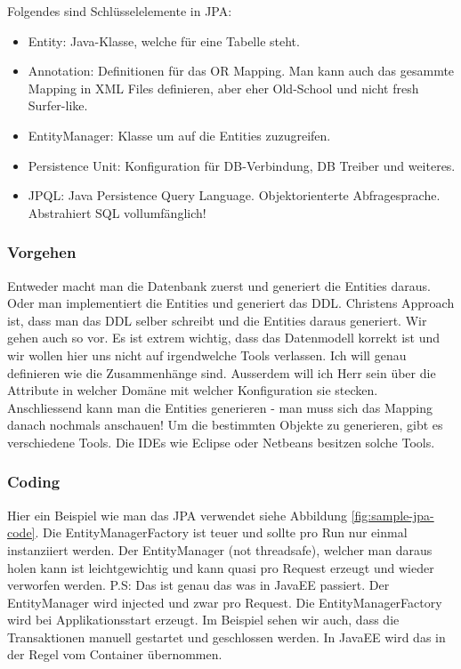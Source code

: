 Folgendes sind Schlüsselelemente in JPA:
\begin{itemize}
	\item Entity: Java-Klasse, welche für eine Tabelle steht.
	\item Annotation: Definitionen für das OR Mapping. Man kann auch das gesammte Mapping in XML Files definieren, aber eher Old-School und nicht fresh Surfer-like.
	\item EntityManager: Klasse um auf die Entities zuzugreifen.
	\item Persistence Unit: Konfiguration für DB-Verbindung, DB Treiber und weiteres.
	\item JPQL: Java Persistence Query Language. Objektorienterte Abfragesprache. Abstrahiert SQL vollumfänglich!
\end{itemize}

\subsubsection{Vorgehen}
Entweder macht man die Datenbank zuerst und generiert die Entities daraus. Oder man implementiert die Entities und generiert das DDL. Christens Approach ist, dass man das DDL selber schreibt und die Entities daraus generiert. Wir gehen auch so vor. Es ist extrem wichtig, dass das Datenmodell korrekt ist und wir wollen hier uns nicht auf irgendwelche Tools verlassen. Ich will genau definieren wie die Zusammenhänge sind. Ausserdem will ich Herr sein über die Attribute in welcher Domäne mit welcher Konfiguration sie stecken. Anschliessend kann man die Entities generieren - man muss sich das Mapping danach nochmals anschauen!
Um die bestimmten Objekte zu generieren, gibt es verschiedene Tools. Die IDEs wie Eclipse oder Netbeans besitzen solche Tools.

\subsubsection{Coding}
Hier ein Beispiel wie man das JPA verwendet siehe Abbildung \ref{fig:sample-jpa-code}. Die EntityManagerFactory ist teuer und sollte pro Run nur einmal instanziiert werden. Der EntityManager (not threadsafe), welcher man daraus holen kann ist leichtgewichtig und kann quasi pro Request erzeugt und wieder verworfen werden. P.S: Das ist genau das was in JavaEE passiert. Der EntityManager wird injected und zwar pro Request. Die EntityManagerFactory wird bei Applikationsstart erzeugt. Im Beispiel sehen wir auch, dass die Transaktionen manuell gestartet und geschlossen werden. In JavaEE wird das in der Regel vom Container übernommen. 

